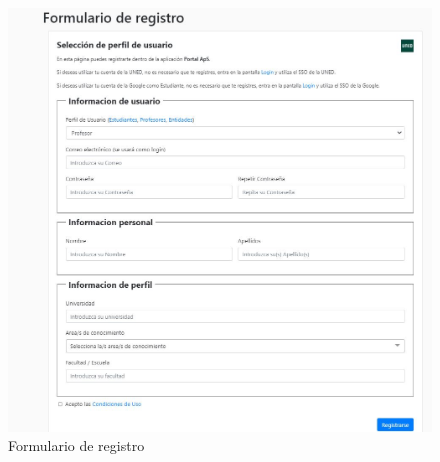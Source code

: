\documentclass[11pt]{article}
\begin{document}
\begin{figure}
	\centering
	\includegraphics[scale=0.7]{registro}
	\caption{Formulario de registro}
\end{figure}
\end{document}
